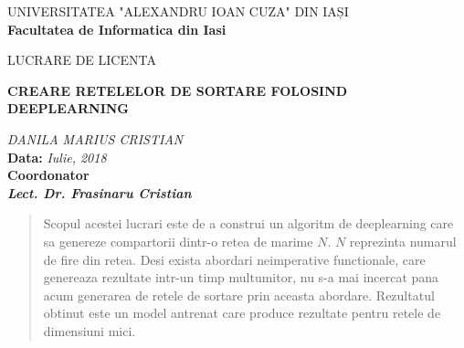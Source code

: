 \documentclass[12pt]{article}
\newcommand\blankpage{%
    \null
    \thispagestyle{empty}%
    \addtocounter{page}{-1}%
    \newpage}
\begin{document}
\afterpage{\blankpage}

\begin{titlepage}

\begin{center}

UNIVERSITATEA "ALEXANDRU IOAN CUZA" DIN IAȘI
\\
\textbf{Facultatea de Informatica din Iasi}
\end{center}

   \vspace{20mm}

\begin{center}
    \end{center}
   \vspace{10mm}
\begin{center}
	\Large{LUCRARE DE LICENTA}\\
	
	\vspace{10mm}
	
	\large \textbf{CREARE RETELELOR DE SORTARE FOLOSIND DEEPLEARNING}\\
	\vspace{5mm}
		
	\vspace{5mm}
	\large\textit {DANILA MARIUS CRISTIAN}
	\\
	\vspace{20mm}
	\textbf{Data: }\textit{Iulie, 2018}\\
	\vspace{10mm}
	\textbf{Coordonator}\\
	\textbf{\textit{Lect. Dr. Frasinaru Cristian}}
	\vspace{30mm}
\end{center}
\end{titlepage} 

\renewcommand{\refname}{Bibliografie}  %
\renewcommand{\contentsname}{Cuprins}
\renewcommand{\figurename}{Fig.}
\newcommand{\code}[1]{\colorbox{light-gray}{\texttt{#1}}}

\begin{abstract}

Scopul acestei lucrari este de a construi un algoritm de deeplearning care sa genereze compartorii dintr-o retea de marime $N$. $N$ reprezinta numarul de fire din retea.
Desi exista abordari neimperative functionale, care genereaza rezultate intr-un timp multumitor, nu s-a mai incercat pana acum generarea de retele de sortare prin aceasta abordare. Rezultatul obtinut este un model antrenat care produce rezultate pentru retele de dimensiuni mici.

\tableofcontents

\end{abstract}
\end{document}
